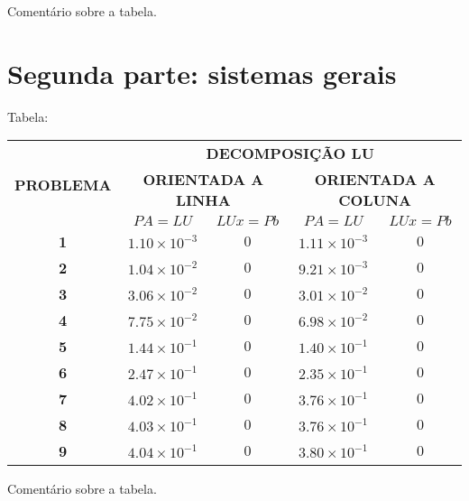 \documentclass[a4paper,11pt]{article}
\begin{document}
Comentário sobre a tabela.


\section{Segunda parte:  sistemas gerais}

Tabela:

\begin{table}[h]
\begin{tabular}{|c|c|c|c|c|}
\hline
\multirow{3}{*}{\textbf{PROBLEMA}} & \multicolumn{4}{c|}{\textbf{DECOMPOSIÇÃO LU}}                                             \\ \cline{2-5} 
                                   & \multicolumn{2}{c|}{\textbf{ORIENTADA A LINHA}} & \multicolumn{2}{c|}{\textbf{ORIENTADA A COLUNA}} \\ \cline{2-5} 
                                   & \textbf{$PA=LU$}         & \textbf{$LUx=Pb$}        & \textbf{$PA=LU$}         & \textbf{$LUx=Pb$}         \\ \hline
\textbf{1}                         & $1.10\times10^{-3}$ &  $0$  & $1.11\times10^{-3}$ &  $0$   \\ \hline
\textbf{2}                         & $1.04\times10^{-2}$ &  $0$  & $9.21\times10^{-3}$ &  $0$   \\ \hline
\textbf{3}                         & $3.06\times10^{-2}$ &  $0$  & $3.01\times10^{-2}$ &  $0$   \\ \hline
\textbf{4}                         & $7.75\times10^{-2}$ &  $0$  & $6.98\times10^{-2}$ &  $0$   \\ \hline
\textbf{5}                         & $1.44\times10^{-1}$ &  $0$  & $1.40\times10^{-1}$ &  $0$   \\ \hline
\textbf{6}                         & $2.47\times10^{-1}$ &  $0$  & $2.35\times10^{-1}$ &  $0$   \\ \hline
\textbf{7}                         & $4.02\times10^{-1}$ &  $0$  & $3.76\times10^{-1}$ &  $0$   \\ \hline
\textbf{8}                         & $4.03\times10^{-1}$ &  $0$  & $3.76\times10^{-1}$ &  $0$   \\ \hline
\textbf{9}                         & $4.04\times10^{-1}$ &  $0$  & $3.80\times10^{-1}$ &  $0$   \\ \hline
\end{tabular}
\end{table}

Comentário sobre a tabela.
\end{document}
